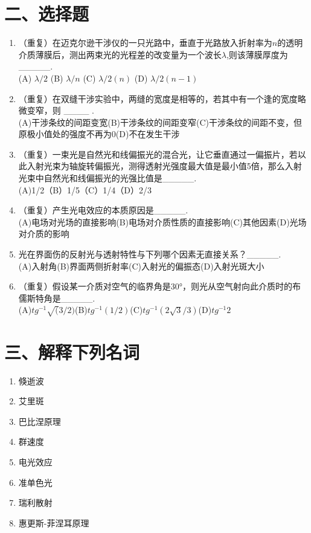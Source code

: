 \documentclass[12pt, a4paper]{article}
\theoremstyle{solution}
\begin{document}
\section*{二、选择题}
\begin{enumerate}
    \item （重复）在迈克尔逊干涉仪的一只光路中，垂直于光路放入折射率为$n$的透明介质薄膜后，测出两束光的光程差的改变量为一个波长$\lambda$,则该薄膜厚度为\_\_\_\_\_.\\(A) $\lambda/2$ \qquad(B) $\lambda/n$ \qquad(C) $\lambda/2(n)$ \qquad(D) $\lambda/2(n-1)$
    \item （重复）在双缝干涉实验中，两缝的宽度是相等的，若其中有一个逢的宽度略微变窄，则 \_\_\_\_ .\\(A)干涉条纹的间距变宽\qquad(B)干涉条纹的间距变窄\qquad(C)干涉条纹的间距不变，但原极小值处的强度不再为0\qquad(D)不在发生干涉
    \item （重复）一束光是自然光和线偏振光的混合光，让它垂直通过一偏振片，若以此入射光束为轴旋转偏振光，测得透射光强度最大值是最小值5倍，那么入射光束中自然光和线偏振光的光强比值是\_\_\_\_\_.\\(A)1/2\qquad（B）1/5\qquad（C）1/4\qquad（D）2/3
    \item （重复）产生光电效应的本质原因是\_\_\_\_\_.\\(A)电场对光场的直接影响\qquad(B)电场对介质性质的直接影响\qquad(C)其他因素\qquad(D)光场对介质的影响
    \item 光在界面伤的反射光与透射特性与下列哪个因素无直接关系？\_\_\_\_\_.\\(A)入射角\qquad(B)界面两侧折射率\qquad(C)入射光的偏振态\qquad(D)入射光斑大小
    \item （重复）假设某一介质对空气的临界角是30°，则光从空气射向此介质时的布儒斯特角是\_\_\_\_\_.\\(A)$tg^{-1}\sqrt({3}/2)$\qquad(B)$tg^{-1}(1/2)$\qquad(C)$tg^{-1}(2\sqrt{3}/3)$\qquad(D)$tg^{-1}2$
\end{enumerate}
\section*{三、解释下列名词}
\begin{enumerate}
    \item 倏逝波
    \item 艾里斑
    \item 巴比涅原理
    \item 群速度
    \item 电光效应
    \item 准单色光
    \item 瑞利散射
    \item 惠更斯-菲涅耳原理
\end{enumerate}
\end{document}
